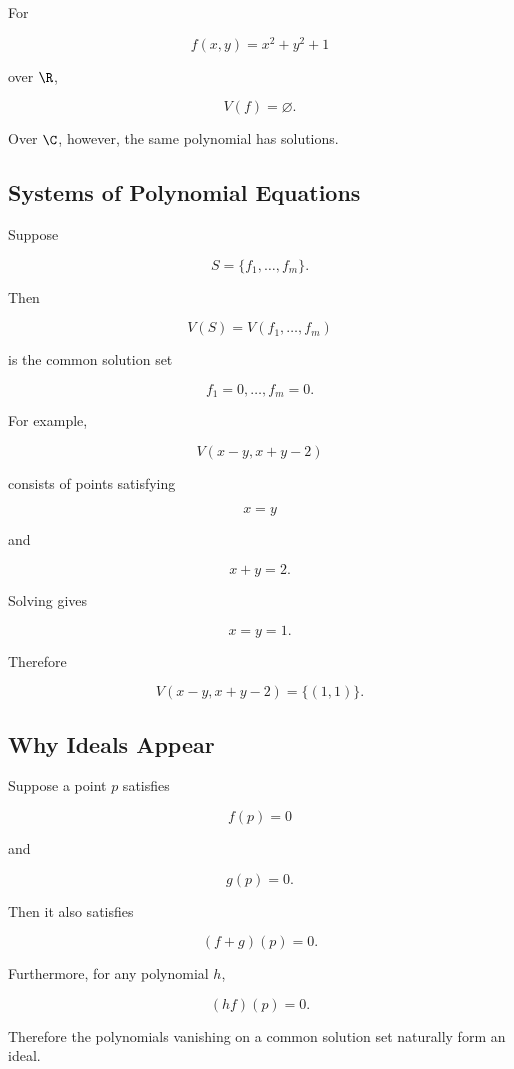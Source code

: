 For

\[
f(x,y)=x^2+y^2+1
\]

over \(\R\),

\[
\boxed{
V(f)=\varnothing.
}
\]

Over \(\C\), however, the same polynomial has solutions.

\subsection{Systems of Polynomial Equations}
\label{subsec:systems-polynomial-equations}

Suppose

\[
S=
\{
f_1,\ldots,f_m
\}.
\]

Then

\[
\boxed{
V(S)
=
V(f_1,\ldots,f_m)
}
\]

is the common solution set

\[
f_1=0,
\ldots,
f_m=0.
\]

For example,

\[
V(x-y,x+y-2)
\]

consists of points satisfying

\[
x=y
\]

and

\[
x+y=2.
\]

Solving gives

\[
x=y=1.
\]

Therefore

\[
\boxed{
V(x-y,x+y-2)=\{(1,1)\}.
}
\]

\subsection{Why Ideals Appear}
\label{subsec:why-ideals-appear}

Suppose a point \(p\) satisfies

\[
f(p)=0
\]

and

\[
g(p)=0.
\]

Then it also satisfies

\[
(f+g)(p)=0.
\]

Furthermore, for any polynomial \(h\),

\[
(hf)(p)=0.
\]

Therefore the polynomials vanishing on a common solution set naturally form
an ideal.

